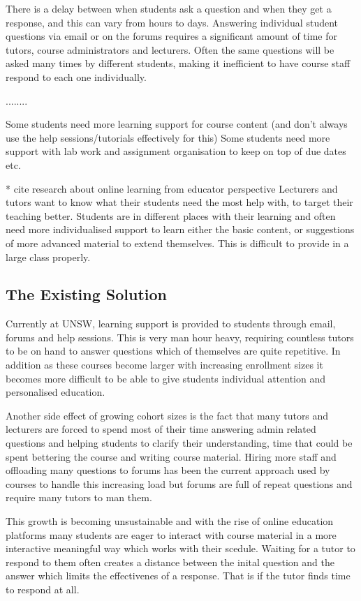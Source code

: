 \documentclass{article}
\begin{document}
There is a delay between when students ask a question and when they get a response, and this can vary from hours to days.
Answering individual student questions via email or on the forums requires a significant amount of time for tutors, course administrators and lecturers. 
Often the same questions will be asked many times by different students, making it inefficient to have course staff respond to each one individually.

........ 

Some students need more learning support for course content (and don't always use the help sessions/tutorials effectively for this)
Some students need more support with lab work and assignment organisation to keep on top of due dates etc. 

* cite research about online learning from educator perspective
Lecturers and tutors want to know what their students need the most help with, to target their teaching better. Students are in different 
places with their learning and often need more individualised support to learn either the basic content, or suggestions of more advanced 
material to extend themselves. This is difficult to provide in a large class properly.

\subsection{The Existing Solution}

Currently at UNSW, learning support is provided to students through email, forums and help sessions. This is very man hour heavy, requiring countless tutors to be on hand to answer questions which of themselves are quite repetitive. In addition as these courses become larger with increasing enrollment sizes it becomes more difficult to be able to give students individual attention and personalised education. 

Another side effect of growing cohort sizes is the fact that many tutors and lecturers are forced to spend most of their time answering admin related questions and helping students to clarify their understanding, time that could be spent bettering the course and writing course material. Hiring more staff and offloading many questions to forums has been the current approach used by courses to handle this increasing load but forums are full of repeat questions and require many tutors to man them. 

This growth is becoming unsustainable and with the rise of online education platforms many students are eager to interact with course material in a more interactive meaningful way which works with their scedule. Waiting for a tutor to respond to them often creates a distance between the inital question and the answer which limits the effectivenes of a response. That is if the tutor finds time to respond at all. 
\end{document}
